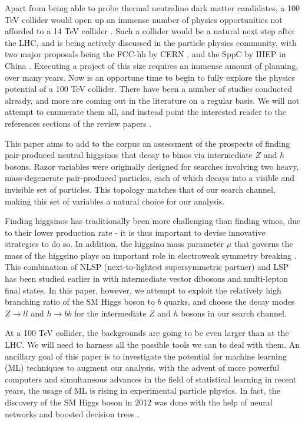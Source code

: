 Apart from being able to probe thermal neutralino dark matter candidates, a 100 TeV collider would open up an immense number of physics opportunities not afforded to a 14 TeV collider \citep{Arkani-Hamed2015}. 
Such a collider would be a natural next step after the LHC, and is being actively discussed in the particle physics community, with two major proposals being the FCC-hh by CERN \citep{FCC-hh}, and the SppC by IHEP in China \citep{CEPC}. Executing a project of this size requires an immense amount of planning, over many years. Now is an opportune time to begin to fully explore the physics potential of a 100 TeV collider. There have been a number of studies conducted already, and more are coming out in the literature on a regular basis. 
We will not attempt to enumerate them all, and instead point the interested reader to the references sections of the review papers \citep{Arkani-Hamed2015,Contino:2016spe,Golling:2016gvc,Mangano:2016jyj}.

This paper aims to add to the corpus an assessment of the prospects of finding pair-produced neutral higgsinos that decay to binos via intermediate $Z$ and $h$ bosons. Razor variables \citep{Rogan2010} were originally designed for searches involving two heavy, mass-degenerate pair-produced particles, each of which decays into a visible and invisible set of particles. This topology matches that of our search channel, making this set of variables a natural choice for our analysis.

Finding higgsinos has traditionally been more challenging than finding winos, due to their lower production rate - it is thus important to devise innovative strategies to do so. In addition, the higgsino mass parameter $\mu$ that governs the mass of the higgsino plays an important role in electroweak symmetry breaking \citep{Acharya2014}. This combination of NLSP (next-to-lightest supersymmetric partner) and LSP has been studied earlier in \citep{Gori:2014oua} with intermediate vector dibosons and multi-lepton final states. In this paper, however, we attempt to exploit the relatively high branching ratio of the SM Higgs boson to $b$ quarks, and choose the decay modes $Z\rightarrow ll$ and $h\rightarrow bb$ for the intermediate $Z$ and $h$ bosons in our search channel.  

At a 100 TeV collider, the backgrounds are going to be even larger than at the LHC. We will need to harness all the possible tools we can to deal with them. An ancillary goal of this paper is to investigate the potential for machine learning (ML) techniques to augment our analysis. with the advent of more powerful computers and simultaneous advances in the field of statistical learning in recent years, the usage of ML is rising in experimental particle physics. In fact, the discovery of the SM Higgs boson in 2012 was done with the help of neural networks \citep{ATLASCollaboration2012} and boosted decision trees \citep{CMSCollaboration2012}.

